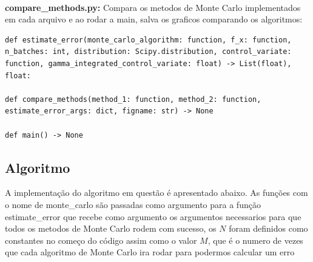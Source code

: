 \documentclass[twocolumn,amsmath,amssymb,floatfix]{revtex4}
\begin{document}
\\\indent \textbf{compare\_methods.py:} Compara os metodos de Monte Carlo implementados em cada arquivo e ao rodar a main, salva os graficos comparando os algoritmos:
\begin{lstlisting}
def estimate_error(monte_carlo_algorithm: function, f_x: function, n_batches: int, distribution: Scipy.distribution, control_variate: function, gamma_integrated_control_variate: float) -> List(float), float:

def compare_methods(method_1: function, method_2: function, estimate_error_args: dict, figname: str) -> None

def main() -> None
\end{lstlisting}
\subsection{Algoritmo}
\indent A implementação do algoritmo em questão é apresentado abaixo. As funções com o nome de monte\_carlo são passadas como argumento para a função estimate\_error que recebe como argumento os argumentos necessarios para que todos os metodos de Monte Carlo rodem com sucesso, os $N$ foram definidos como constantes no começo do código assim como o valor $M$, que é o numero de vezes que cada algoritmo de Monte Carlo ira rodar para podermos calcular um erro
\end{document}
